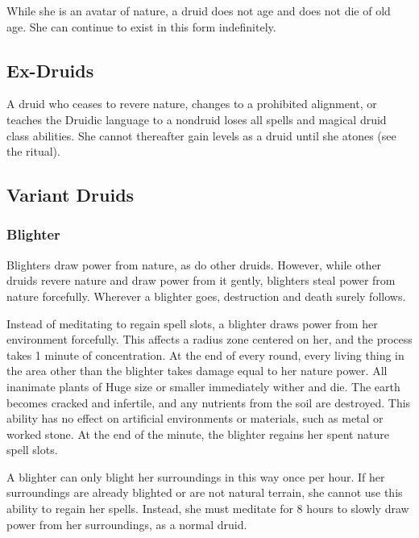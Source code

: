     While she is an avatar of nature, a druid does not age and does not die of old age.
    She can continue to exist in this form indefinitely.

    \subsection{Ex-Druids}
        A druid who ceases to revere nature, changes to a prohibited alignment, or teaches the Druidic language to a nondruid loses all spells and magical druid class abilities.
        She cannot thereafter gain levels as a druid until she atones (see the  ritual).

    \subsection{Variant Druids}

        \subsubsection{Blighter}

            Blighters draw power from nature, as do other druids. However, while other druids revere nature and draw power from it gently, blighters steal power from nature forcefully. Wherever a blighter goes, destruction and death surely follows.

             Instead of meditating to regain spell slots, a blighter draws power from her environment forcefully.
            This affects a \areahuge radius zone centered on her, and the process takes 1 minute of concentration.
            At the end of every round, every living thing in the area other than the blighter takes damage equal to her nature power.
            All inanimate plants of Huge size or smaller immediately wither and die.
            The earth becomes cracked and infertile, and any nutrients from the soil are destroyed.
            This ability has no effect on artificial environments or materials, such as metal or worked stone.
            At the end of the minute, the blighter regains her spent nature spell slots.

            A blighter can only blight her surroundings in this way once per hour.
            If her surroundings are already blighted or are not natural terrain, she cannot use this ability to regain her spells.
            Instead, she must meditate for 8 hours to slowly draw power from her surroundings, as a normal druid.

